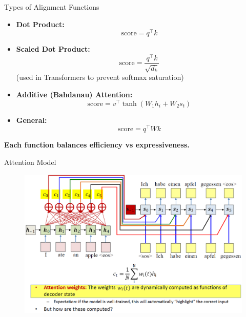 \begin{frame}{Types of Alignment Functions}
    \begin{itemize}
        \item \textbf{Dot Product:}
        \[
            \text{score} = q^\top k
        \]
        \item \textbf{Scaled Dot Product:}
        \[
            \text{score} = \frac{q^\top k}{\sqrt{d_k}}
        \]
        (used in Transformers to prevent softmax saturation)
        \item \textbf{Additive (Bahdanau) Attention:}
        \[
            \text{score} = v^\top \tanh(W_1 h_i + W_2 s_t)
        \]
        \item \textbf{General:}
        \[
            \text{score} = q^\top W k
        \]
    \end{itemize}
    \vspace{0.5em}
    \textbf{\faThumbTack\hspace{0.5em}Each function balances efficiency vs expressiveness.}
\end{frame}

\begin{frame}{Attention Model}
    \begin{figure}
        \centering
        \includegraphics[width=\textwidth]{images/attention/attention-1.png}
    \end{figure}
\end{frame}

